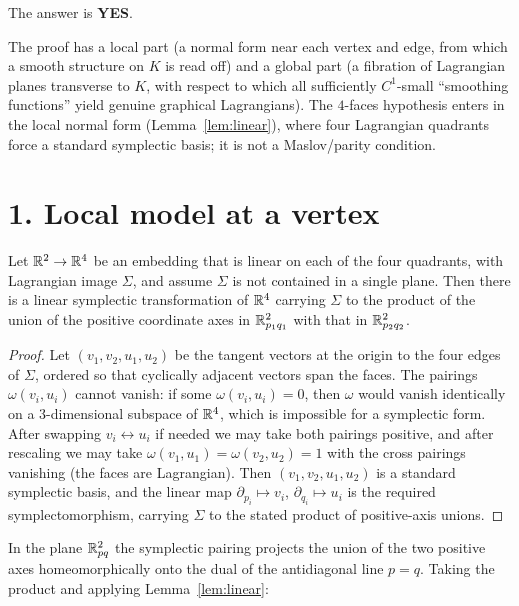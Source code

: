 \documentclass[11pt]{article}
\begin{document}
\medskip
\noindent The answer is \textbf{YES}.

\medskip
The proof has a local part (a normal form near each vertex and edge, from which
a smooth structure on $K$ is read off) and a global part (a fibration of
Lagrangian planes transverse to $K$, with respect to which all sufficiently
$C^1$-small ``smoothing functions'' yield genuine graphical Lagrangians). The
$4$-faces hypothesis enters in the local normal form (Lemma~\ref{lem:linear}),
where four Lagrangian quadrants force a standard symplectic basis; it is not a
Maslov/parity condition.

\section*{1. Local model at a vertex}

\begin{qeightlemma}\label{lem:linear}
Let $\mathbb{R}^2\to\mathbb{R}^4$ be an embedding that is linear on each of the four quadrants,
with Lagrangian image $\Sigma$, and assume $\Sigma$ is not contained in a single
plane. Then there is a linear symplectic transformation of $\mathbb{R}^4$ carrying
$\Sigma$ to the product of the union of the positive coordinate axes in
$\mathbb{R}^2_{p_1q_1}$ with that in $\mathbb{R}^2_{p_2q_2}$.
\end{qeightlemma}

\begin{proof}
Let $(v_1,v_2,u_1,u_2)$ be the tangent vectors at the origin to the four edges of
$\Sigma$, ordered so that cyclically adjacent vectors span the faces. The
pairings $\omega(v_i,u_i)$ cannot vanish: if some $\omega(v_i,u_i)=0$, then
$\omega$ would vanish identically on a $3$-dimensional subspace of $\mathbb{R}^4$, which
is impossible for a symplectic form. After swapping $v_i\leftrightarrow u_i$ if
needed we may take both pairings positive, and after rescaling we may take
$\omega(v_1,u_1)=\omega(v_2,u_2)=1$ with the cross pairings vanishing (the faces
are Lagrangian). Then $(v_1,v_2,u_1,u_2)$ is a standard symplectic basis, and the
linear map $\partial_{p_i}\mapsto v_i$, $\partial_{q_i}\mapsto u_i$ is the
required symplectomorphism, carrying $\Sigma$ to the stated product of
positive-axis unions.
\end{proof}

In the plane $\mathbb{R}^2_{pq}$ the symplectic pairing projects the union of the two
positive axes homeomorphically onto the dual of the antidiagonal line $p=q$.
Taking the product and applying Lemma~\ref{lem:linear}:
\end{document}
